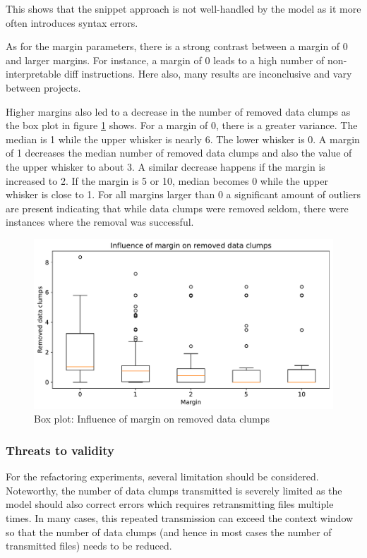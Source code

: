 This shows that the snippet approach is not well-handled by the model as it more often introduces syntax errors. 



As for the margin parameters, there is a strong contrast between a margin of 0 and larger margins. For instance, a margin of 0 leads to a high number of non-interpretable diff instructions. Here also, many results are inconclusive and vary between projects. 

Higher margins also led to a decrease in the number of removed data clumps as the box plot in figure \ref{fig:refactor_margin_removedDataClumps} shows. 
For a margin of 0, there is a greater variance. The median is 1 while the upper whisker is nearly 6. The lower whisker is 0. A margin of 1 decreases the median number of removed data clumps and also the value of the upper whisker to about 3. A similar decrease happens if the margin is increased to 2. If the margin is 5 or 10, median becomes 0 while the upper whisker is close to 1. For all margins larger than 0 a significant amount of outliers are present indicating that while data clumps were removed seldom, there were instances where the removal was successful. 
\begin{figure}
    \centering
    \includegraphics[width=\columnwidth]{figures/chapter5/refactor_margin_removed_data_clumps.pdf}
    \caption{Box plot: Influence of margin on removed data clumps}
    \label{fig:refactor_margin_removedDataClumps}
\end{figure}

\subsubsection{Threats to validity}

For the refactoring experiments, several limitation should be considered. Noteworthy, the number of data clumps transmitted is severely limited as the model should also correct errors which requires retransmitting files multiple times. In many cases, this repeated transmission can exceed the context window so that the number of data clumps (and hence in most cases the number of transmitted files)  needs to be reduced. 


